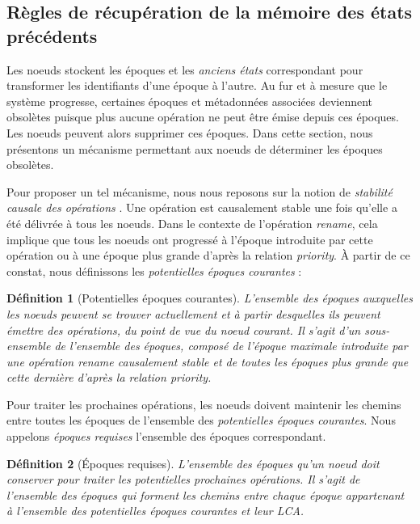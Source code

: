 \documentclass[12pt]{thesul}
\newtheorem{definition}{Définition}
\begin{document}
\subsection{Règles de récupération de la mémoire des états précédents}

\label{sec:gc-mechanism}

Les noeuds stockent les époques et les \emph{anciens états} correspondant pour transformer les identifiants d'une époque à l'autre.
Au fur et à mesure que le système progresse, certaines époques et métadonnées associées deviennent obsolètes puisque plus aucune opération ne peut être émise depuis ces époques.
Les noeuds peuvent alors supprimer ces époques.
Dans cette section, nous présentons un mécanisme permettant aux noeuds de déterminer les époques obsolètes.

Pour proposer un tel mécanisme, nous nous reposons sur la notion de \emph{stabilité causale des opérations} \cite{10.1007/978-3-662-43352-2_11}.
Une opération est causalement stable une fois qu'elle a été délivrée à tous les noeuds.
Dans le contexte de l'opération \emph{rename}, cela implique que tous les noeuds ont progressé à l'époque introduite par cette opération ou à une époque plus grande d'après la relation \emph{priority}.
À partir de ce constat, nous définissons les \emph{potentielles époques courantes} :

\begin{definition}[Potentielles époques courantes]
  L'ensemble des époques auxquelles les noeuds peuvent se trouver actuellement et à partir desquelles ils peuvent émettre des opérations, du point de vue du noeud courant.
  Il s'agit d'un sous-ensemble de l'ensemble des époques, composé de l'époque maximale introduite par une opération \emph{rename} causalement stable et de toutes les époques plus grande que cette dernière d'après la relation \emph{priority}.
\end{definition}

Pour traiter les prochaines opérations, les noeuds doivent maintenir les chemins entre toutes les époques de l'ensemble des \emph{potentielles époques courantes}.
Nous appelons \emph{époques requises} l'ensemble des époques correspondant.

\begin{definition}[Époques requises]
  L'ensemble des époques qu'un noeud doit conserver pour traiter les potentielles prochaines opérations.
  Il s'agit de l'ensemble des époques qui forment les chemins entre chaque époque appartenant à l'ensemble des \emph{potentielles époques courantes} et leur \acf{LCA}.
\end{definition}
\end{document}
